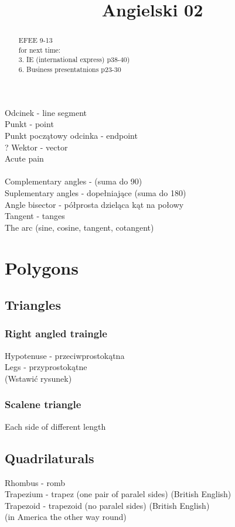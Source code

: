 \documentclass[a4paper,10pt]{article}
\title{Angielski 02}
\author{}
\begin{document}
\maketitle

\begin{abstract}
EFEE 9-13 \\
for next time: \\
3. IE (international express) p38-40) \\
6. Business presentatnions p23-30 \\
\end{abstract}

\section{}
Odcinek - line segment \\
Punkt - point \\
Punkt początowy odcinka - endpoint \\
? Wektor - vector \\

Acute pain \\
\\
Complementary angles -  (suma do 90) \\
Suplementary angles - dopełniające (suma do 180) \\
Angle bisector - półprosta dzieląca kąt na połowy \\
Tangent - tanges \\
The arc (sine, cosine, tangent, cotangent)

\section{Polygons}
\subsection{Triangles}
\subsubsection{Right angled traingle}
Hypotenuse - przeciwprostokątna \\
Legs - przyprostokątne \\
(Wstawić rysunek)
\subsubsection{Scalene triangle}
Each side of different length
\subsection{Quadrilaturals}
Rhombus - romb\\
Trapezium - trapez (one pair of paralel sides) (British English) \\
Trapezoid - trapezoid (no paralel sides) (British English)\\ (in America the other way round)
\end{document}
